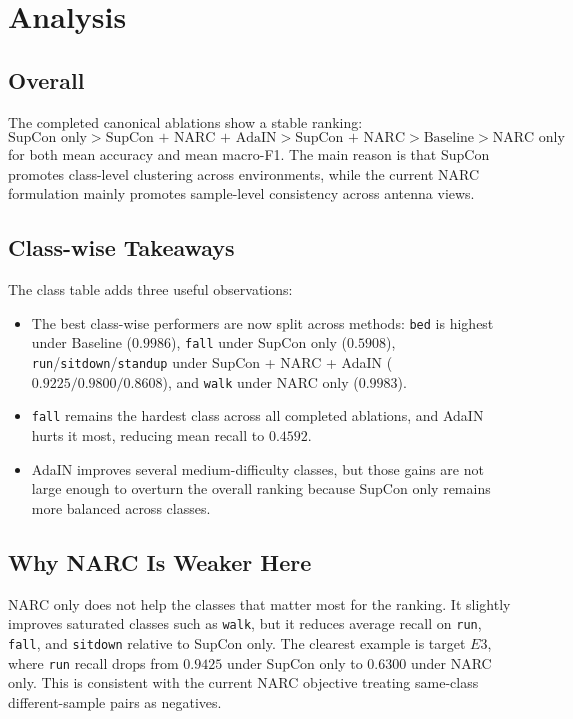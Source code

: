 \documentclass[11pt]{article}
\begin{document}
\section{Analysis}

\subsection{Overall}
The completed canonical ablations show a stable ranking:
\[
\text{SupCon only} > \text{SupCon + NARC + AdaIN} > \text{SupCon + NARC} > \text{Baseline} > \text{NARC only}
\]
for both mean accuracy and mean macro-F1. The main reason is that SupCon promotes class-level clustering across environments, while the current NARC formulation mainly promotes sample-level consistency across antenna views.

\subsection{Class-wise Takeaways}
The class table adds three useful observations:
\begin{itemize}
    \item The best class-wise performers are now split across methods: \texttt{bed} is highest under Baseline ($0.9986$), \texttt{fall} under SupCon only ($0.5908$), \texttt{run}/\texttt{sitdown}/\texttt{standup} under SupCon + NARC + AdaIN ($0.9225/0.9800/0.8608$), and \texttt{walk} under NARC only ($0.9983$).
    \item \texttt{fall} remains the hardest class across all completed ablations, and AdaIN hurts it most, reducing mean recall to $0.4592$.
    \item AdaIN improves several medium-difficulty classes, but those gains are not large enough to overturn the overall ranking because SupCon only remains more balanced across classes.
\end{itemize}

\subsection{Why NARC Is Weaker Here}
NARC only does not help the classes that matter most for the ranking. It slightly improves saturated classes such as \texttt{walk}, but it reduces average recall on \texttt{run}, \texttt{fall}, and \texttt{sitdown} relative to SupCon only. The clearest example is target $E3$, where \texttt{run} recall drops from $0.9425$ under SupCon only to $0.6300$ under NARC only. This is consistent with the current NARC objective treating same-class different-sample pairs as negatives.
\end{document}

